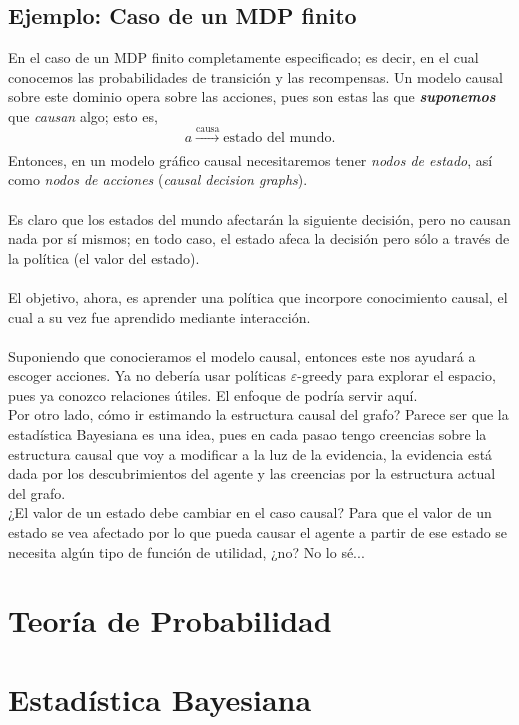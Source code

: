 \documentclass[11pt]{article}
\theoremstyle{plain}
\begin{document}
\subsection{Ejemplo: Caso de un MDP finito}
En el caso de un MDP finito completamente especificado; es decir, en el cual conocemos las probabilidades de transición y las recompensas. Un modelo causal sobre este dominio opera sobre las acciones, pues son estas las que \textbf{\textit{suponemos}} que \textit{causan} algo; esto es, 
\[ a \xrightarrow[]{\text{causa}} \textrm{estado del mundo}. \]
Entonces, en un modelo gráfico causal necesitaremos tener \textit{nodos de estado}, así como \textit{nodos de acciones} (\textit{causal decision graphs}).\\
\\
Es claro que los estados del mundo afectarán la siguiente decisión, pero no causan nada por sí mismos; en todo caso, el estado afeca la decisión pero sólo a través de la política (el valor del estado).\\
\\
El objetivo, ahora, es aprender una política que incorpore conocimiento causal, el cual a su vez fue aprendido mediante interacción.\\
\\
Suponiendo que conocieramos el modelo causal, entonces este nos ayudará a escoger acciones. Ya no debería usar políticas $\varepsilon$-greedy para explorar el espacio, pues ya conozco relaciones útiles. El enfoque de \cite{lattimore2017nips} podría servir aquí.
\\
Por otro lado, cómo ir estimando la estructura causal del grafo? Parece ser que la estadística Bayesiana es una idea, pues en cada pasao tengo creencias sobre la estructura causal que voy a modificar a la luz de la evidencia, la evidencia está dada por los descubrimientos del agente y las creencias por la estructura actual del grafo.
\\
¿El valor de un estado debe cambiar en el caso causal? Para que el valor de un estado se vea afectado por lo que pueda causar el agente a partir de ese estado se necesita algún tipo de función de utilidad, ¿no? No lo sé...
\newpage


\appendix
\section{Teoría de Probabilidad}
\section{Estadística Bayesiana}
\end{document}
